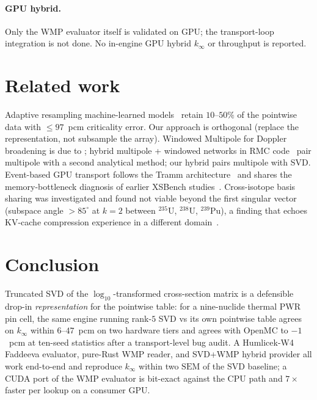 \documentclass[11pt,a4paper]{article}
\begin{document}
\paragraph{GPU hybrid.}
Only the WMP evaluator itself is validated on GPU; the
transport-loop integration is not done. No in-engine GPU
hybrid $k_\infty$ or throughput is reported.

\section{Related work}
\label{sec:related}

Adaptive resampling machine-learned
models~\cite{ml_resampling_2025,ml_fullcore_2026} retain
$10$--$50\%$ of the pointwise data with $\leq 97$~pcm
criticality error. Our approach is orthogonal (replace the
representation, not subsample the array). Windowed Multipole
for Doppler broadening is due to
\cite{josey2015wmp,forget2014wmp}; hybrid multipole + windowed
networks in RMC code~\cite{hybrid_wn_2021} pair multipole with
a second analytical method; our hybrid pairs multipole with
SVD. Event-based GPU transport follows the Tramm
architecture~\cite{tramm2024} and shares the memory-bottleneck
diagnosis of earlier XSBench studies~\cite{tramm2014xsbench}.
Cross-isotope basis sharing was investigated and found not
viable beyond the first singular vector (subspace angle
$>\!85^\circ$ at $k=2$ between $^{235}$U, $^{238}$U,
$^{239}$Pu), a finding that echoes KV-cache compression
experience in a different domain~\cite{minicache2024}.

\section{Conclusion}

Truncated SVD of the $\log_{10}$-transformed cross-section
matrix is a defensible drop-in \emph{representation} for
the pointwise table: for a nine-nuclide thermal PWR pin cell,
the same engine running rank-$5$ SVD vs its own pointwise
table agrees on $k_\infty$ within $6$--$47$~pcm on two
hardware tiers and agrees with OpenMC to $-1$~pcm at
ten-seed statistics after a transport-level bug audit. A
Humlicek-W4 Faddeeva evaluator, pure-Rust WMP reader, and
SVD+WMP hybrid provider all work end-to-end and reproduce
$k_\infty$ within two $\mathrm{SEM}$ of the SVD baseline; a
CUDA port of the WMP evaluator is bit-exact against the CPU
path and $7\times$ faster per lookup on a consumer GPU.
\end{document}
